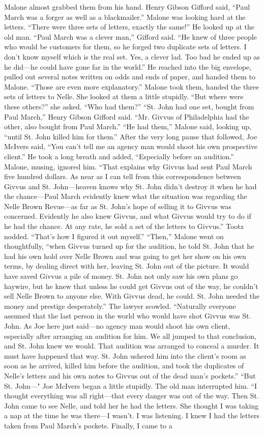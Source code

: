 \documentclass{novel}
\begin{document}
Malone almost grabbed them from his hand. Henry Gibson Gifford said, “Paul March was a forger as well as a blackmailer.” Malone was looking hard at the letters. “There were three sets of letters, exactly the same!” He looked up at the old man. “Paul March was a clever man,” Gifford said. “He knew of three people who would be customers for them, so he forged two duplicate sets of letters. I don’t know myself which is the real set. Yes, a clever lad. Too bad he ended up as he did—he could have gone far in the world.” He reached into the big envelope, pulled out several notes written on odds and ends of paper, and handed them to Malone. “Those are even more explanatory.” Malone took them, handed the three sets of letters to Nelle. She looked at them a little stupidly. “But where were these others?” she asked. “Who had them?” “St. John had one set, bought from Paul March,” Henry Gibson Gifford said. “Mr. Givvus of Philadelphia had the other, also bought from Paul March.” “He had them,” Malone said, looking up, “until St. John killed him for them.” After the very long pause that followed, Joe McIvers said, “You can’t tell me an agency man would shoot his own prospective client.” He took a long breath and added, “Especially before an audition.” Malone, musing, ignored him. “That explains why Givvus had sent Paul March five hundred dollars. As near as I can tell from this correspondence between Givvus and St. John—heaven knows why St. John didn’t destroy it when he had the chance—Paul March evidently knew what the situation was regarding the Nelle Brown Revue—as far as St. John’s hope of selling it to Givvus was concerned. Evidently he also knew Givvus, and what Givvus would try to do if he had the chance. At any rate, he sold a set of the letters to Givvus.” Tootz nodded. “That’s how I figured it out myself.” “Then,” Malone went on thoughtfully, “when Givvus turned up for the audition, he told St. John that he had his own hold over Nelle Brown and was going to get her show on his own terms, by dealing direct with her, leaving St. John out of the picture. It would have saved Givvus a pile of money. St. John not only saw his own plans go haywire, but he knew that unless he could get Givvus out of the way, he couldn’t sell Nelle Brown to anyone else. With Givvus dead, he could. St. John needed the money and prestige desperately.” The lawyer scowled. “Naturally everyone assumed that the last person in the world who would have shot Givvus was St. John. As Joe here just said—no agency man would shoot his own client, especially after arranging an audition for him. We all jumped to that conclusion, and St. John knew we would. That audition was arranged to conceal a murder. It must have happened that way. St. John ushered him into the client’s room as soon as he arrived, killed him before the audition, and took the duplicates of Nelle’s letters and his own notes to Givvus out of the dead man’s pockets.” “But St. John—" Joe McIvers began a little stupidly. The old man interrupted him. “I thought everything was all right—that every danger was out of the way. Then St. John came to see Nelle, and told her he had the letters. She thought I was taking a nap at the time he was there—I wasn’t. I was listening. I knew I had the letters taken from Paul March’s pockets. Finally, I came to a 
\end{document}
